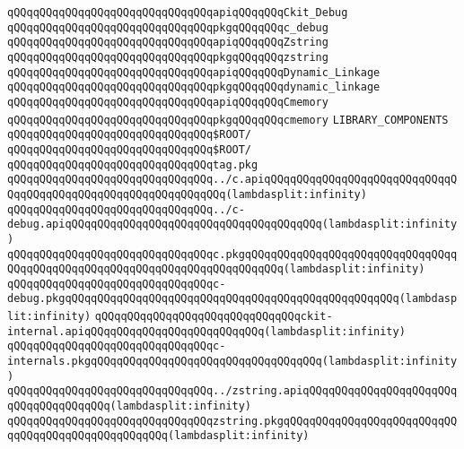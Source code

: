 \newline
\verb|qQQqqQQqqQQqqQQqqQQqqQQqqQQqqQQqapiqQQqqQQqCkit_Debug|\newline
\verb|qQQqqQQqqQQqqQQqqQQqqQQqqQQqqQQqpkgqQQqqQQqc_debug|\newline
\newline
\verb|qQQqqQQqqQQqqQQqqQQqqQQqqQQqqQQqapiqQQqqQQqZstring|\newline
\verb|qQQqqQQqqQQqqQQqqQQqqQQqqQQqqQQqpkgqQQqqQQqzstring|\newline
\newline
\verb|qQQqqQQqqQQqqQQqqQQqqQQqqQQqqQQqapiqQQqqQQqDynamic_Linkage|\newline
\verb|qQQqqQQqqQQqqQQqqQQqqQQqqQQqqQQqpkgqQQqqQQqdynamic_linkage|\newline
\newline
\verb|qQQqqQQqqQQqqQQqqQQqqQQqqQQqqQQqapiqQQqqQQqCmemory|\newline
\verb|qQQqqQQqqQQqqQQqqQQqqQQqqQQqqQQqpkgqQQqqQQqcmemory|\newline
\newline
\newline
\newline
\verb|LIBRARY_COMPONENTS|\newline
\newline
\verb|qQQqqQQqqQQqqQQqqQQqqQQqqQQqqQQq$ROOT/|\newline
\newline
\verb|qQQqqQQqqQQqqQQqqQQqqQQqqQQqqQQq$ROOT/|\newline
\newline
\verb|qQQqqQQqqQQqqQQqqQQqqQQqqQQqqQQqtag.pkg|\newline
\newline
\verb|qQQqqQQqqQQqqQQqqQQqqQQqqQQqqQQq../c.apiqQQqqQQqqQQqqQQqqQQqqQQqqQQqqQQqqQQqqQQqqQQqqQQqqQQqqQQqqQQqqQQq(lambdasplit:infinity)|\newline
\verb|qQQqqQQqqQQqqQQqqQQqqQQqqQQqqQQq../c-debug.apiqQQqqQQqqQQqqQQqqQQqqQQqqQQqqQQqqQQqqQQq(lambdasplit:infinity)|\newline
\verb|qQQqqQQqqQQqqQQqqQQqqQQqqQQqqQQqc.pkgqQQqqQQqqQQqqQQqqQQqqQQqqQQqqQQqqQQqqQQqqQQqqQQqqQQqqQQqqQQqqQQqqQQqqQQqqQQq(lambdasplit:infinity)|\newline
\verb|qQQqqQQqqQQqqQQqqQQqqQQqqQQqqQQqc-debug.pkgqQQqqQQqqQQqqQQqqQQqqQQqqQQqqQQqqQQqqQQqqQQqqQQqqQQq(lambdasplit:infinity)|\newline
\verb|qQQqqQQqqQQqqQQqqQQqqQQqqQQqqQQqckit-internal.apiqQQqqQQqqQQqqQQqqQQqqQQqqQQq(lambdasplit:infinity)|\newline
\verb|qQQqqQQqqQQqqQQqqQQqqQQqqQQqqQQqc-internals.pkgqQQqqQQqqQQqqQQqqQQqqQQqqQQqqQQqqQQq(lambdasplit:infinity)|\newline
\newline
\verb|qQQqqQQqqQQqqQQqqQQqqQQqqQQqqQQq../zstring.apiqQQqqQQqqQQqqQQqqQQqqQQqqQQqqQQqqQQqqQQq(lambdasplit:infinity)|\newline
\verb|qQQqqQQqqQQqqQQqqQQqqQQqqQQqqQQqzstring.pkgqQQqqQQqqQQqqQQqqQQqqQQqqQQqqQQqqQQqqQQqqQQqqQQqqQQq(lambdasplit:infinity)|\newline


